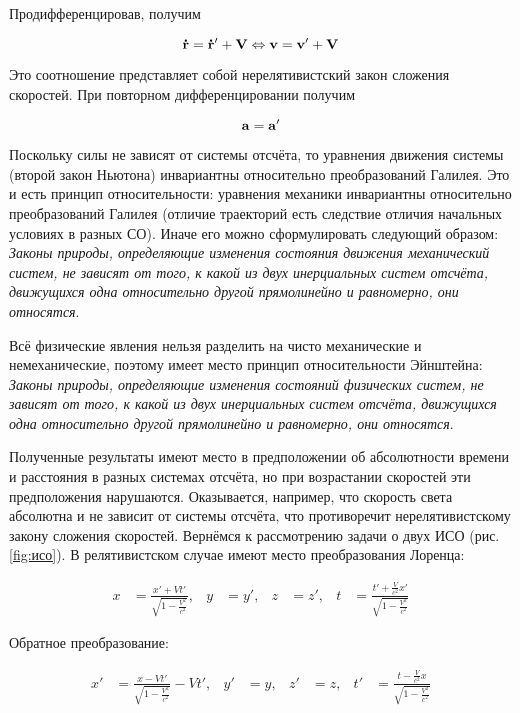 \noindent
Продифференцировав, получим

\begin{equation}
    \mathbf{\dot r} = \mathbf{\dot r'} + \mathbf V \Leftrightarrow \mathbf v = \mathbf v' + \mathbf V
\end{equation}

\noindent
Это соотношение представляет собой нерелятивистский закон сложения скоростей. При повторном дифференцировании получим

\begin{equation}
    \mathbf a = \mathbf a'
\end{equation}

Поскольку силы не зависят от системы отсчёта, то уравнения движения системы (второй закон Ньютона) инвариантны относительно преобразований Галилея. Это и есть принцип относительности: уравнения механики инвариантны относительно преобразований Галилея (отличие траекторий есть следствие отличия начальных условиях в разных СО). Иначе его можно сформулировать следующий образом: \textit{Законы природы, определяющие изменения состояния движения механический систем, не зависят от того, к какой из двух инерциальных систем отсчёта, движущихся одна относительно другой прямолинейно и равномерно, они относятся}.

Всё физические явления нельзя разделить на чисто механические и немеханические, поэтому имеет место принцип относительности Эйнштейна: \textit{Законы природы, определяющие изменения состояний физических систем, не зависят от того, к какой из двух инерциальных систем отсчёта, движущихся одна относительно другой прямолинейно и равномерно, они относятся}.

Полученные результаты имеют место в предположении об абсолютности времени и расстояния в разных системах отсчёта, но при возрастании скоростей эти предположения нарушаются. Оказывается, например, что скорость света абсолютна и не зависит от системы отсчёта, что противоречит нерелятивистскому закону сложения скоростей. Вернёмся к рассмотрению задачи о двух ИСО (рис. \ref{fig:исо}). В релятивистском случае имеют место преобразования Лоренца:

\begin{align} \label{eq:преобразования лоренца}
    x &= \frac{x' + V t'}{\sqrt{1 - \frac{V^2}{c^2}}}, & y &= y', & z &= z', & t &= \frac{t' + \frac{V}{c^2}x'}{\sqrt{1 - \frac{V^2}{c^2}}}
\end{align}

\noindent
Обратное преобразование:

\begin{align} \label{eq:обратные преобразования лоренца}
    x' &= \frac{x - V t'}{\sqrt{1 - \frac{V^2}{c^2}}} - V t', & y' &= y, & z' &= z, & t' &= \frac{t - \frac{V}{c^2}x}{\sqrt{1 - \frac{V^2}{c^2}}}
\end{align}

